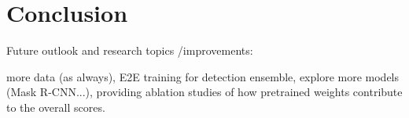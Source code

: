 \chapter{Conclusion}\label{chapter:conclusion}


Future outlook and research topics /improvements:

more data (as always), E2E training for detection ensemble, explore more models (Mask R-CNN...), providing ablation studies of how pretrained weights contribute to the overall scores.